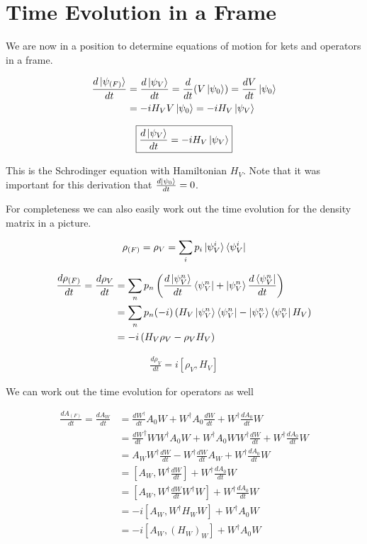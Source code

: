 \documentclass[12pt]{article}
\newcommand{\ddt}[1]{\frac{d #1}{dt}}
\begin{document}
\section{Time Evolution in a Frame}

We are now in a position to determine equations of motion for kets and operators in a frame.

\begin{align}
\ddt{\ket{\psi_{(F)}}} &= \ddt{\ket{\psi_V}} = \ddt{}(V\ket{\psi_0}) = \ddt{V} \ket{\psi_0}\\
&= -iH_V V\ket{\psi_0} = -i H_V \ket{\psi_V}
\end{align}

\begin{align}
\boxed{\ddt{\ket{\psi_V}} = -iH_V \ket{\psi_V}}
\end{align}

This is the Schrodinger equation with Hamiltonian $H_V$. Note that it was important for this derivation that $\ddt{\ket{\psi_0}}=0$.

For completeness we can also easily work out the time evolution for the density matrix in a picture.

\begin{align}
\rho_{(F)} = \rho_V = \sum_i p_i \ket{\psi_V^i}\bra{\psi_V^i}
\end{align}

\begin{align}
\ddt{\rho_{(F)}} = \ddt{\rho_V} &= \sum_n p_n \left(\ddt{\ket{\psi_V^n}}\bra{\psi_V^n} + \ket{\psi_V^n}\ddt{\bra{\psi_V^n}} \right)\\
&= \sum_n p_n (-i)\left(H_V \ket{\psi_V^n}\bra{\psi_V^n} - \ket{\psi_V^n}\bra{\psi_V^n}H_V \right)\\
&= -i\left(H_V \rho_V - \rho_V H_V\right)
\end{align}

\begin{align}
\boxed{\ddt{\rho_V} = i\left[\rho_V,H_V\right]}
\end{align}

We  can work out the time evolution for operators as well

\begin{align}
\ddt{A_{(F)}} = \ddt{A_W} &= \ddt{W^{\dag}} A_0 W + W^{\dag}A_0 \ddt{W} + W^{\dag} \ddt{A_0} W\\
&= \ddt{W}^{\dag} W W^{\dag} A_0 W + W^{\dag}A_0 W W^{\dag} \ddt{W} + W^{\dag}\ddt{A_0} W\\
&= A_W W^{\dag} \ddt{W} - W^{\dag}\ddt{W} A_W + W^{\dag}\ddt{A_0}W\\
&= \left[A_W, W^{\dag} \ddt{W}\right] + W^{\dag} \ddt{A_0} W\\
&= \left[A_W, W^{\dag} \ddt{W} W^{\dag} W\right] + W^{\dag} \ddt{A_0} W\\
&= -i\left[A_W, W^{\dag} H_W W\right] + W^{\dag} A_0 W\\
&= -i\left[A_W, (H_W)_W\right] + W^{\dag} A_0 W\\
\end{align}
\end{document}
